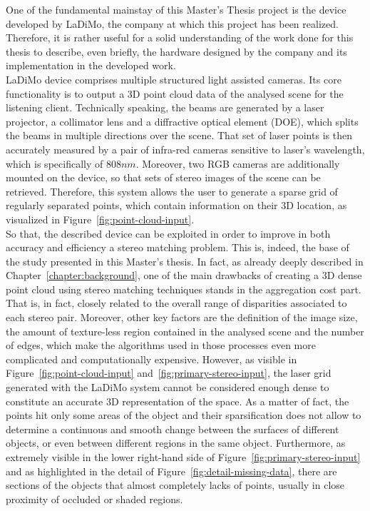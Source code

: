 One of the fundamental mainstay of this Master's Thesis project is the device developed by LaDiMo, the company at which this project has been realized.
Therefore, it is rather useful for a solid understanding of the work done for this thesis to describe, even briefly, the hardware designed by the company and its implementation in the developed work. \\
LaDiMo device comprises multiple structured light assisted cameras. 
Its core functionality is to output a 3D point cloud data of the analysed scene for the listening client. 
Technically speaking, the beams are generated by a laser projector, a collimator lens and a diffractive optical element (DOE), which splits the beams in multiple directions over the scene.
That set of laser points is then accurately measured by a pair of infra-red cameras sensitive to laser's wavelength, which is specifically of $808 nm$.
Moreover, two RGB cameras are additionally mounted on the device, so that sets of stereo images of the scene can be retrieved.
Therefore, this system allows the user to generate a sparse grid of regularly separated points, which contain information on their 3D location, as visualized in Figure~\ref{fig:point-cloud-input}. \\
So that, the described device can be exploited in order to improve in both accuracy and efficiency a stereo matching problem.
This is, indeed, the base of the study presented in this Master's thesis. 
In fact, as already deeply described in Chapter~\ref{chapter:background}, one of the main drawbacks of creating a 3D dense point cloud using stereo matching techniques stands in the aggregation cost part. 
That is, in fact, closely related to the overall range of disparities associated to each stereo pair. 
Moreover, other key factors are the definition of the image size, the amount of texture-less region contained in the analysed scene and the number of edges, which make the algorithms used in those processes even more complicated and computationally expensive. 
However, as visible in Figure~\ref{fig:point-cloud-input} and~\ref{fig:primary-stereo-input}, the laser grid generated with the LaDiMo system cannot be considered enough dense to constitute an accurate 3D representation of the space. 
As a matter of fact, the points hit only some areas of the object and their sparsification does not allow to determine a continuous and smooth change between the surfaces of different objects, or even between different regions in the same object.
Furthermore, as extremely visible in the lower right-hand side of Figure~\ref{fig:primary-stereo-input} and as highlighted in the detail of Figure~\ref{fig:detail-missing-data}, there are sections of the objects that almost completely lacks of points, usually in close proximity of occluded or shaded regions.\\
